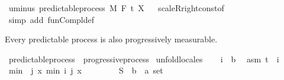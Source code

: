 \begin{isabellebody}
%
\endisadelimproof
\isanewline
{}\isamarkupfalse%
\ uminus{\isacharcolon}{\kern0pt}\ {\isachardoublequoteopen}predictable{\isacharunderscore}{\kern0pt}process\ M\ F\ t\ {\isacharparenleft}{\kern0pt}{\isacharminus}{\kern0pt}X{\isacharparenright}{\kern0pt}{\isachardoublequoteclose}%
\isadelimproof
\ %
\endisadelimproof
%
\isatagproof
{}\isamarkupfalse%
\ scaleR{\isacharunderscore}{\kern0pt}right{\isacharunderscore}{\kern0pt}const{\isacharprime}{\kern0pt}{\isacharbrackleft}{\kern0pt}of\ {\isachardoublequoteopen}{\isacharminus}{\kern0pt}{}{\isachardoublequoteclose}{\isacharbrackright}{\kern0pt}\ \isamarkupfalse%
\ {\isacharparenleft}{\kern0pt}simp\ add{\isacharcolon}{\kern0pt}\ fun{\isacharunderscore}{\kern0pt}Compl{\isacharunderscore}{\kern0pt}def{\isacharparenright}{\kern0pt}%
\endisatagproof
{\isafoldproof}%
%
\isadelimproof
%
\endisadelimproof
\isanewline
\isanewline
{}\isamarkupfalse%
%
\begin{isamarkuptext}%
Every predictable process is also progressively measurable.%
\end{isamarkuptext}\isamarkuptrue%
\isamarkupfalse%
\ predictable{\isacharunderscore}{\kern0pt}process\ {\isasymsubseteq}\ progressive{\isacharunderscore}{\kern0pt}process\isanewline
%
\isadelimproof
%
\endisadelimproof
%
\isatagproof
{}\isamarkupfalse%
\ {\isacharparenleft}{\kern0pt}unfold{\isacharunderscore}{\kern0pt}locales{\isacharparenright}{\kern0pt}\isanewline
\ \ \isamarkupfalse%
\ i\ {\isacharcolon}{\kern0pt}{\isacharcolon}{\kern0pt}\ {\isacharprime}{\kern0pt}b\ \isamarkupfalse%
\ asm{\isacharcolon}{\kern0pt}\ {\isachardoublequoteopen}t\ {\isasymle}\ i{\isachardoublequoteclose}\isanewline
\ \ \isamarkupfalse%
\ {\isacharquery}{\kern0pt}min\ {\isacharequal}{\kern0pt}\ {\isachardoublequoteopen}{\isacharparenleft}{\kern0pt}{\isasymlambda}{\isacharparenleft}{\kern0pt}j{\isacharcomma}{\kern0pt}\ x{\isacharparenright}{\kern0pt}{\isachardot}{\kern0pt}\ {\isacharparenleft}{\kern0pt}min\ i\ j{\isacharcomma}{\kern0pt}\ x{\isacharparenright}{\kern0pt}{\isacharparenright}{\kern0pt}{\isachardoublequoteclose}\isanewline
\ \ \isacommand{{\isacharbraceleft}{\kern0pt}}\isamarkupfalse%
\isanewline
\ \ \ \ \isamarkupfalse%
\ S\ {\isacharcolon}{\kern0pt}{\isacharcolon}{\kern0pt}\ {\isachardoublequoteopen}{\isacharparenleft}{\kern0pt}{\isacharprime}{\kern0pt}b\ {\isasymtimes}\ {\isacharprime}{\kern0pt}a{\isacharparenright}{\kern0pt}\ set{\isachardoublequoteclose}\ \isamarkupfalse%

\end{isabellebody}
